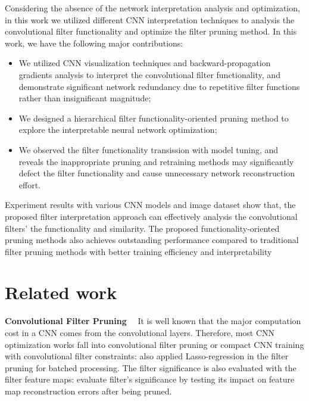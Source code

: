\documentclass{article} %
\begin{document}
Considering the absence of the network interpretation analysis and optimization, in this work we utilized different CNN interpretation techniques to analysis the convolutional filter functionality and optimize the filter pruning method.
In this work, we have the following major contributions:

\vspace{-1mm}\begin{itemize}
	\item We utilized CNN visualization techniques and backward-propagation gradients analysis to interpret the convolutional filter functionality, and demonstrate significant network redundancy due to repetitive filter functions rather than insignificant magnitude;
	\item We designed a hierarchical filter functionality-oriented pruning method to explore the interpretable neural network optimization;
	\item We observed the filter functionality transission with model tuning, and reveals the inappropriate pruning and retraining methods may significantly defect the filter functionality and cause unnecessary network reconstruction effort.
\end{itemize}\vspace{-1mm}

Experiment results with various CNN models and image dataset show that, the proposed filter interpretation approach can effectively analysis the convolutional filters' the functionality and similarity.
	The proposed functionality-oriented pruning methods also achieves outstanding performance compared to traditional filter pruning methods with better training efficiency and interpretability

\section{Related work}\label{sec:prelim}\textbf{Convolutional Filter Pruning}
~~It is well known that the major computation cost in a CNN comes from the convolutional layers.
	Therefore, most CNN optimization works fall into convolutional filter pruning or compact CNN training with convolutional filter constraints:
	\cite{he2017channel} also applied Lasso-regression in the filter pruning for batched processing.
The filter significance is also evaluated with the filter feature maps:
	\cite{lLuo2017Thinet} evaluate filter's significance by testing its impact on feature map reconstruction errors after being pruned.
\end{document}
